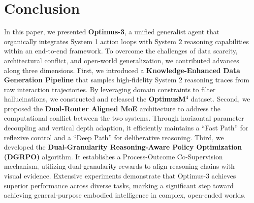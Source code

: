 \section{Conclusion}

In this paper, we presented \textbf{Optimus-3}, a unified generalist agent that organically integrates System 1 action loops with System 2 reasoning capabilities within an end-to-end framework. To overcome the challenges of data scarcity, architectural conflict, and open-world generalization, we contributed advances along three dimensions. First, we introduced a \textbf{Knowledge-Enhanced Data Generation Pipeline} that samples high-fidelity System 2 reasoning traces from raw interaction trajectories. By leveraging domain constraints to filter hallucinations, we constructed and released the \textbf{OptimusM$^4$} dataset. 
Second, we proposed the \textbf{Dual-Router Aligned MoE} architecture to address the computational conflict between the two systems. Through horizontal parameter decoupling and vertical depth adaption, it efficiently maintains a ``Fast Path'' for reflexive control and a ``Deep Path'' for deliberative reasoning. 
Third, we developed the \textbf{Dual-Granularity Reasoning-Aware Policy Optimization (DGRPO)} algorithm. It establishes a Process-Outcome Co-Supervision mechanism, utilizing dual-granularity rewards to align reasoning chains with visual evidence. Extensive experiments demonstrate that Optimus-3 achieves superior performance across diverse tasks, marking a significant step toward achieving general-purpose embodied intelligence in complex, open-ended worlds.


